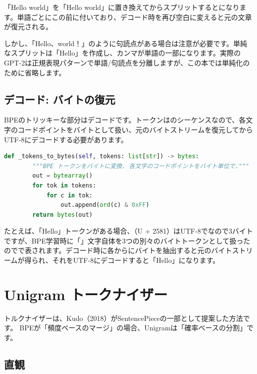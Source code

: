 \begin{warnbox}[空白置換の罠]
「Hello world」を「Hello world」に置き換えてからスプリットするとになります。単語ごとにこの前に付いており、デコード時を再び空白に変えると元の文章が復元される。

しかし、「Hello、world！」のように句読点がある場合は注意が必要です。単純なスプリットは「Hello」を作成し、カンマが単語の一部になります。実際のGPT-2は正規表現パターンで単語/句読点を分離しますが、この本では単純化のために省略します。
\end{warnbox}

\subsection{デコード: バイトの復元}

BPEのトリッキーな部分はデコードです。トークンはのシーケンスなので、各文字のコードポイントをバイトとして扱い、元のバイトストリームを復元してからUTF-8にデコードする必要があります。

\begin{lstlisting}[language=Python]
    def _tokens_to_bytes(self, tokens: list[str]) -> bytes:
        """BPE トークンをバイトに変換. 各文字のコードポイントをバイト単位で."""
        out = bytearray()
        for tok in tokens:
            for c in tok:
                out.append(ord(c) & 0xFF)
        return bytes(out)
\end{lstlisting}

たとえば、「He​​llo」トークンがある場合、（U + 2581）はUTF-8でなので3バイトですが、BPE学習時に「」文字自体を3つの別々のバイトトークンとして扱ったのでで表されます。デコード時に各からにバイトを抽出すると元のバイトストリームが得られ、それをUTF-8にデコードすると「Hello」になります。

\section{Unigram トークナイザー}

トルクナイザーは、Kudo（2018）がSentencePieceの一部として提案した方法です。 BPEが「頻度ベースのマージ」の場合、Unigramは「確率ベースの分割」です。

\subsection{直観}

